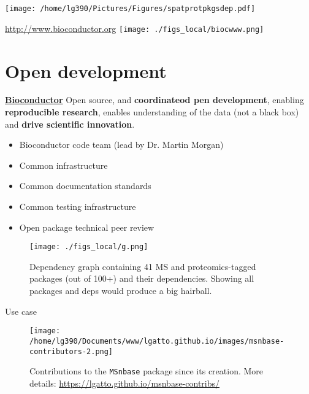 \begin{frame}
\texttt{[image: /home/lg390/Pictures/Figures/spatprotpkgsdep.pdf]}
\end{frame}


\begin{frame}{\url{http://www.bioconductor.org}}
\texttt{[image: ./figs\_local/biocwww.png]}
\end{frame}

\section{Open development}


\begin{frame}{}
  \href{http://bioconductor.org/}{\textbf{Bioconductor}} Open source,
  and \textbf{coordinateod pen development}, enabling
  \textbf{reproducible research}, enables understanding of the data
  (not a black box) and \textbf{drive scientific innovation}.
  \begin{itemize}
  \item Bioconductor code team (lead by Dr. Martin Morgan)
  \item Common infrastructure
  \item Common documentation standards
  \item Common testing infrastructure
  \item Open package technical peer review
  \end{itemize}
\end{frame}

\begin{frame}
  \begin{figure}[h]
    \centering
    \texttt{[image: ./figs\_local/g.png]}
    \caption{Dependency graph containing 41 MS and proteomics-tagged
      packages (out of 100+) and their dependencies. Showing all
      packages and deps would produce a big hairball.}
  \end{figure}
\end{frame}

\begin{frame}{Use case}
  \begin{figure}[h]
    \centering
    \texttt{[image: /home/lg390/Documents/www/lgatto.github.io/images/msnbase-contributors-2.png]}
    \caption{Contributions to the \texttt{MSnbase} package since its
      creation. More details:
      \url{https://lgatto.github.io/msnbase-contribs/}}
    \label{fig:msnbase}
  \end{figure}
  
  
  
\end{frame}